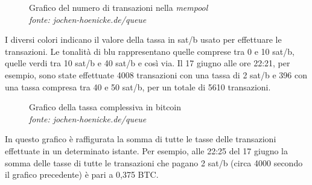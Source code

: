 \documentclass {article}
\begin{document}
\vspace {0.5cm}
\begin{figure}[htb!]
\captionsetup{width=1.4\linewidth}
\caption {Grafico del numero di transazioni nella \textit{mempool}\\\textit{fonte: jochen-hoenicke.de/queue}}
\end{figure}
\vspace {0.2cm}
\noindent
%
I diversi colori indicano il valore della tassa in sat/b usato per effettuare le transazioni.
Le tonalità di blu rappresentano quelle comprese tra 0 e 10 sat/b, quelle verdi tra 10 sat/b e 40 sat/b e così via.
Il 17 giugno alle ore 22:21, per esempio, sono state effettuate 4008 transazioni con una tassa di 2 sat/b e 396 con una tassa compresa tra 40 e 50 sat/b, per un totale di 5610 transazioni.

\vspace {0.5cm}
\begin{figure}[htb!]
\captionsetup{width=1.4\linewidth}
\caption {Grafico della tassa complessiva in bitcoin\\\textit{fonte: jochen-hoenicke.de/queue}}
\end{figure}
\vspace {0.2cm}
\noindent
%
In questo grafico è raffigurata la somma di tutte le tasse delle transazioni effettuate in un determinato istante.
Per esempio, alle 22:25 del 17 giugno la somma delle tasse di tutte le transazioni che pagano 2 sat/b (circa 4000 secondo il grafico precedente) è pari a 0,375 BTC.
\end{document}
